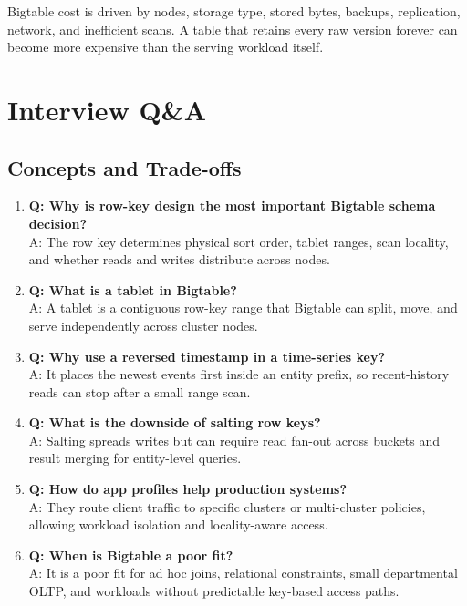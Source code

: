 \begin{notebox}
Bigtable cost is driven by nodes, storage type, stored bytes, backups, replication, network, and inefficient scans. A table that retains every raw version forever can become more expensive than the serving workload itself.
\end{notebox}

\section{Interview Q\&A}
\subsection{Concepts and Trade-offs}
\begin{enumerate}
    \item \textbf{Q: Why is row-key design the most important Bigtable schema decision?}\\
    A: The row key determines physical sort order, tablet ranges, scan locality, and whether reads and writes distribute across nodes.

    \item \textbf{Q: What is a tablet in Bigtable?}\\
    A: A tablet is a contiguous row-key range that Bigtable can split, move, and serve independently across cluster nodes.

    \item \textbf{Q: Why use a reversed timestamp in a time-series key?}\\
    A: It places the newest events first inside an entity prefix, so recent-history reads can stop after a small range scan.

    \item \textbf{Q: What is the downside of salting row keys?}\\
    A: Salting spreads writes but can require read fan-out across buckets and result merging for entity-level queries.

    \item \textbf{Q: How do app profiles help production systems?}\\
    A: They route client traffic to specific clusters or multi-cluster policies, allowing workload isolation and locality-aware access.

    \item \textbf{Q: When is Bigtable a poor fit?}\\
    A: It is a poor fit for ad hoc joins, relational constraints, small departmental OLTP, and workloads without predictable key-based access paths.
\end{enumerate}

